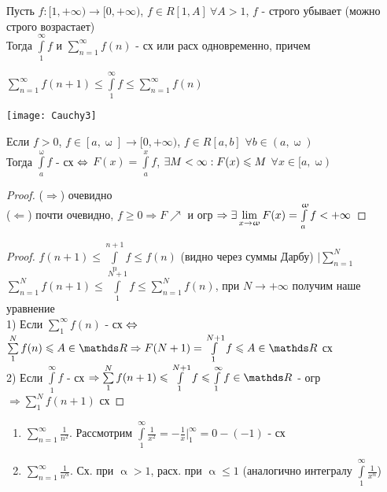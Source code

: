 \documentclass[11pt, fleqn]{article}
\begin{document}
\begin{Property}[3]
\begin{Property}[4]
\begin{Property}[2, аддитивность]
\begin{Proof}
\begin{theorem}
    Пусть $f: [1, +\infty) \rightarrow [0, +\infty)$, $f \in R[1,A]\ \forall A > 1$, $f$ - строго убывает (можно строго возрастает)
    \\
    Тогда $\int\limits_1^\infty f$ и $\sum\limits_{n=1}^\infty f(n)$ - сх или расх одновременно, причем
    
    $\sum\limits_{n=1}^\infty f(n+1) \leqslant \int\limits_1^\infty f \leqslant \sum\limits_{n=1}^{\infty} f(n)$
    
    \texttt{[image: Cauchy3]}
\end{theorem}

\begin{lemma}
    Если $f>0$, $f \in [a, \upomega] \rightarrow [0, +\infty)$, $f\in R[a,b]$ $\forall b \in (a, \upomega)$
    \\
    Тогда $\int\limits_a^\upomega f$ - сх $\Leftrightarrow$ $F(x) = \int\limits_a^x f$, $\exists M < \infty:  F(x) \leqslant M $ $\forall x \in [a, \upomega)$
\end{lemma}

\begin{proof}
    ($\Rightarrow$) очевидно
    \\
    ($\Leftarrow$) почти очевидно, $f \geqslant 0 \Rightarrow F \nearrow$ и огр $\Rightarrow \exists \lim\limits_{x \rightarrow \upomega} F(x) = \int\limits_a^\upomega f < +\infty$
\end{proof}

\begin{proof}
    $f(n+1) \leqslant \int\limits_n^{n+1} f \leqslant f(n)$ (видно через суммы Дарбу) $|\sum\limits_{n=1}^N$
    \\
    $\sum\limits_{n=1}^N f(n+1) \leqslant \int\limits_1^{N+1} f \leqslant \sum\limits_{n=1}^N f(n)$, при $N \rightarrow +\infty$ получим наше уравнение
    \\
    1) Если $\sum\limits_1^\infty f (n)$ - сх $\Leftrightarrow$ $\sum\limits_1^N f(n) \leqslant A \in \R \Rightarrow F(N+1) = \int\limits_1^{N+1} f \leqslant A \in \R$ сх
    \\
    2) Если $\int\limits_1^\infty f$ - сх $\Rightarrow \sum\limits_1^N f(n+1) \leqslant \int\limits_1^{N+1} f \leqslant \int\limits_1^\infty f \in \R$ - огр $\Rightarrow \sum\limits_1^N f(n+1)$ сх
\end{proof}

\begin{examples}
    \begin{enumerate}
        \item $\sum\limits_{n=1}^\infty \frac{1}{n^2}$. Рассмотрим $\int\limits_1^\infty \frac{1}{x^2} = - \frac{1}{x} |_1^\infty = 0 - (-1)$ - сх
        \item $\sum\limits_{n=1}^\infty \frac{1}{n^\upalpha}$. Сх. при $\upalpha > 1$, расх. при $\upalpha \leqslant 1$ (аналогично интегралу $\int\limits_{1}^\infty \frac{1}{x^\upalpha}$)
    \end{enumerate}
\end{examples}


\end{Proof}
\end{Property}
\end{Property}
\end{Property}
\end{document}
